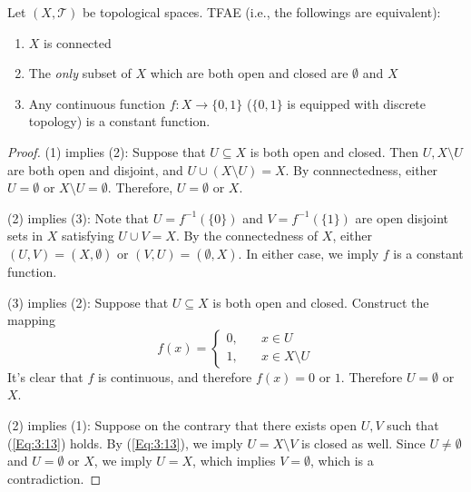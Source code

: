 \begin{proposition}
Let $(X,\mathcal{T})$ be topological spaces.
TFAE (i.e., the followings are equivalent):
\begin{enumerate}
\item
$X$ is connected
\item
The \emph{only} subset of $X$ which are both open and closed are $\emptyset$ and $X$
\item
Any continuous function $f:X\to\{0,1\}$ ($\{0,1\}$ is equipped with discrete topology) is a constant function.
\end{enumerate}
\end{proposition}
\begin{proof}
(1) implies (2): Suppose that $U\subseteq X$ is both open and closed. 
Then $U,X\setminus U$ are both open and disjoint, and $U\cup(X\setminus U) = X$.
By connnectedness, either $U=\emptyset$ or $X\setminus U=\emptyset$.
Therefore, $U=\emptyset$ or $X$.

(2) implies (3): 
Note that  $U = f^{-1}(\{0\})$ and $V = f^{-1}(\{1\})$ are open disjoint sets in $X$ satisfying $U\cup V = X$.
By the connectedness of $X$, either $(U,V)=(X,\emptyset)$ or $(V,U)=(\emptyset,X)$. In either case, we imply $f$ is a constant function.


(3) implies (2): 
Suppose that $U\subseteq X$ is both open and closed. 
Construct the mapping
\[
f(x) = \left\{
\begin{aligned}
0,&\quad x\in U\\
1,&\quad x\in X\setminus U
\end{aligned}
\right.
\]
It's clear that $f$ is continuous, and therefore $f(x)=0$ or $1$. 
Therefore $U=\emptyset$ or $X$.

(2) implies (1): Suppose on the contrary that there exists open $U,V$ such that (\ref{Eq:3:13}) holds. By (\ref{Eq:3:13}), we imply $U=X\setminus V$ is closed as well. Since $U\ne\emptyset$ and $U=\emptyset$ or $X$, we imply $U=X$, which implies $V=\emptyset$, which is a contradiction.
\end{proof}

